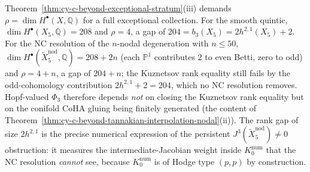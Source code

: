 \begin{remark}
\label{rem:cy-c-beyond-kuznetsov-rank-gap-integers}
Theorem~\ref{thm:cy-c-beyond-exceptional-stratum}(iii) demands
$\rho = \dim H^\bullet(X, \mathbb Q)$ for a full exceptional
collection. For the smooth quintic,
$\dim H^\bullet(X_5, \mathbb Q) = 208$ and $\rho = 4$, a gap of
$204 = b_3(X_5) = 2 h^{2,1}(X_5) + 2$. For the NC resolution of the
$n$-nodal degeneration with $n \leq 50$,
$\dim H^\bullet(\widetilde X_5^{\mathrm{nod}}, \mathbb Q) = 208 + 2n$
(each $\mathbb P^1$ contributes $2$ to even Betti, zero to odd) and
$\rho = 4 + n$, a gap of $204 + n$; the Kuznetsov rank equality
still fails by the odd-cohomology contribution $2h^{2,1} + 2 = 204$,
which no NC resolution removes. Hopf-valued $\Phi_3$ therefore
depends \emph{not} on closing the Kuznetsov rank equality but on the
conifold CoHA gluing being finitely generated (the content of
Theorem~\ref{thm:cy-c-beyond-tannakian-interpolation-nodal}(ii)).
The rank gap of size $2 h^{2,1}$ is the precise numerical expression
of the persistent $J^3(\widetilde X_5^{\mathrm{nod}}) \neq 0$
obstruction: it measures the intermediate-Jacobian weight inside
$K_0^{\mathrm{num}}$ that the NC resolution \emph{cannot} see,
because $K_0^{\mathrm{num}}$ is of Hodge type $(p,p)$ by construction.
\end{remark}

